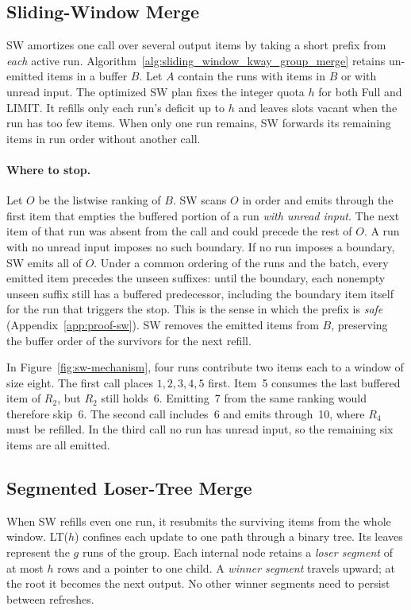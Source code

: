 

\subsection{Sliding-Window Merge}
\label{sec:sw}
SW amortizes one call over several output items by taking a short prefix from \emph{each} active run. Algorithm~\ref{alg:sliding_window_kway_group_merge} retains un-emitted items in a buffer $B$. Let $A$ contain the runs with items in $B$ or with unread input. The optimized SW plan fixes the integer quota $h$ for both Full and \textsf{LIMIT}. It refills only each run's deficit up to $h$ and leaves slots vacant when the run has too few items. When only one run remains, SW forwards its remaining items in run order without another call.



\paragraph{Where to stop.}
Let $O$ be the listwise ranking of $B$. SW scans $O$ in order and emits through the first item that empties the buffered portion of a run \emph{with unread input}. The next item of that run was absent from the call and could precede the rest of $O$. A run with no unread input imposes no such boundary. If no run imposes a boundary, SW emits all of $O$. Under a common ordering of the runs and the batch, every emitted item precedes the unseen suffixes: until the boundary, each nonempty unseen suffix still has a buffered predecessor, including the boundary item itself for the run that triggers the stop. This is the sense in which the prefix is \emph{safe} (Appendix~\ref{app:proof-sw}). SW removes the emitted items from $B$, preserving the buffer order of the survivors for the next refill.



In Figure~\ref{fig:sw-mechanism}, four runs contribute two items each to a window of size eight. The first call places $1,2,3,4,5$ first. Item~5 consumes the last buffered item of $R_2$, but $R_2$ still holds~6. Emitting~7 from the same ranking would therefore skip~6. The second call includes~6 and emits through~10, where $R_4$ must be refilled. In the third call no run has unread input, so the remaining six items are all emitted.

\subsection{Segmented Loser-Tree Merge}
\label{sec:lt}
When SW refills even one run, it resubmits the surviving items from the whole window. LT($h$) confines each update to one path through a binary tree. Its leaves represent the $g$ runs of the group. Each internal node retains a \emph{loser segment} of at most $h$ rows and a pointer to one child. A \emph{winner segment} travels upward; at the root it becomes the next output. No other winner segments need to persist between refreshes.

